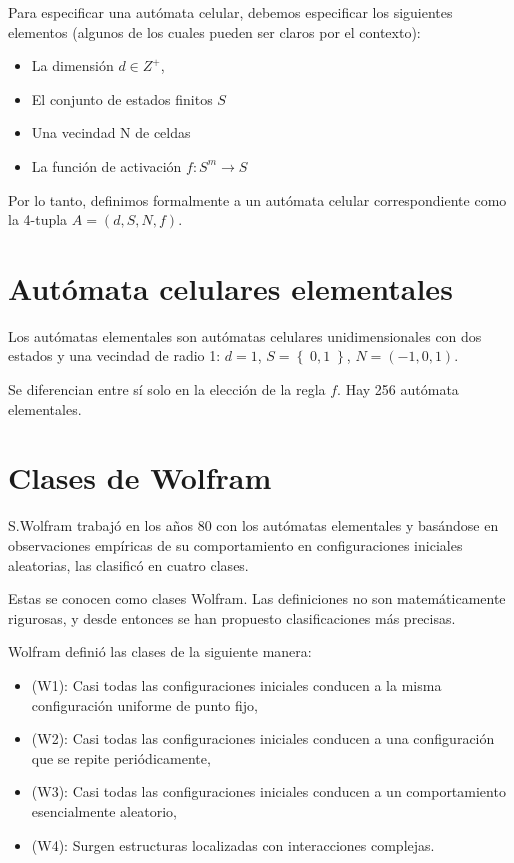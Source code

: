 \documentclass[12pt, fleqn]{report}                             %
\theoremstyle{break}                                            %
\newcommand{\Set}[1]            {\left\{ \; #1 \; \right\}}     %
\begin{document}
      Para especificar una autómata celular, debemos especificar los siguientes 
      elementos (algunos de los cuales pueden ser claros por el contexto):
      \begin{itemize}
        \item La dimensión $d \in Z^+$,
        \item El conjunto de estados finitos $S$
        \item Una vecindad N de celdas
        \item La función de activación $f: S^m \to S$
      \end{itemize}

      Por lo tanto, definimos formalmente a un autómata celular 
      correspondiente como la 4-tupla $A = (d, S, N, f)$.

      \section{Autómata celulares elementales}

      Los autómatas elementales son autómatas celulares unidimensionales con dos estados y una
      vecindad de radio 1: $d = 1$, $S = \Set{0, 1}$, $N = (-1, 0, 1)$.
      
      Se diferencian entre sí solo en la elección de la regla $f$. 
      Hay 256 autómata elementales.

      \section{Clases de Wolfram}

      S.Wolfram trabajó en los años 80 con los autómatas elementales y basándose en observaciones empíricas 
      de su comportamiento en configuraciones iniciales aleatorias, las clasificó en cuatro clases.

      Estas se conocen como clases Wolfram. 
      Las definiciones no son matemáticamente rigurosas, y desde entonces se han propuesto 
      clasificaciones más precisas.

      Wolfram definió las clases de la siguiente manera:
      \begin{itemize}
        \item (W1): Casi todas las configuraciones iniciales conducen a la misma configuración uniforme de punto fijo,
        \item (W2): Casi todas las configuraciones iniciales conducen a una configuración que se repite periódicamente,
        \item (W3): Casi todas las configuraciones iniciales conducen a un comportamiento esencialmente aleatorio,
        \item (W4): Surgen estructuras localizadas con interacciones complejas.
      \end{itemize}
\end{document}
